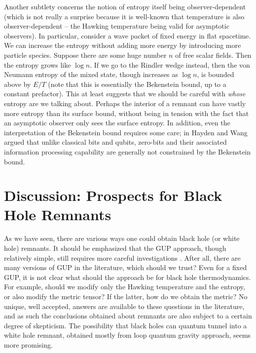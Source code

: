 \documentclass[preprintnumbers, floatfix, preprintnumbers, letterpaper, twocolumn, superscriptaddress,nofootinbib]{revtex4-2}
\begin{document}
Another subtlety concerns the notion of entropy itself being observer-dependent (which is not really a surprise because it is well-known that temperature is also observer-dependent -- the Hawking temperature being valid for asymptotic observers). In particular, consider a wave packet of fixed energy in flat spacetime. We can increase the entropy without adding more energy by introducing more particle species. Suppose there are some huge number $n$ of free scalar fields. Then the entropy grows like $\log n$. If we go to the Rindler wedge instead, then the von Neumann entropy of the mixed state, though increases as $\log n$, is bounded above by $E/T$ \cite{0310022} (note that this is essentially the Bekenstein bound, up to a constant prefactor). This at least suggests that we should be careful with \emph{whose} entropy are we talking about. Perhaps the interior of a remnant can have vastly more entropy than its surface bound, without being in tension with the fact that an asymptotic observer only sees the surface entropy. In addition, even the interpretation of the Bekenstein bound requires some care; in \cite{2309.07436} Hayden and Wang argued that unlike classical bits and qubits, zero-bits and their associated information processing capability are generally not constrained by the Bekenstein bound. 

\section{Discussion: Prospects for Black Hole Remnants}

As we have seen, there are various ways one could obtain black hole (or white hole) remnants. It should be emphasized that the GUP approach, though relatively simple, still requires more careful investigations \cite{2005.12075,2303.10719,2305.16193}. After all, there are many versions of GUP in the literature, which should we trust? Even for a fixed GUP, it is not clear what should the approach be for black hole thermodynamics. For example, should we modify only the Hawking temperature and the entropy, or also modify the metric tensor? If the latter, how do we obtain the metric? No unique, well accepted, answers are available to these questions in the literature, and as such the conclusions obtained about remnants are also subject to a certain degree of skepticism. The possibility that black holes can quantum tunnel into a white hole remnant, obtained mostly from loop quantum gravity approach, seems more promising.
\end{document}
